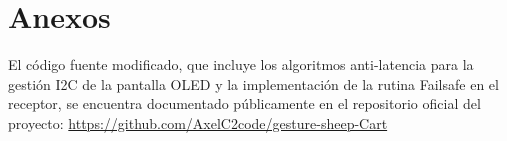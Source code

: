 \documentclass[conference]{IEEEtran}
\begin{document}
\section*{Anexos}
El código fuente modificado, que incluye los algoritmos anti-latencia para la gestión I2C de la pantalla OLED y la implementación de la rutina Failsafe en el receptor, se encuentra documentado públicamente en el repositorio oficial del proyecto:
\url{https://github.com/AxelC2code/gesture-sheep-Cart}
\end{document}

